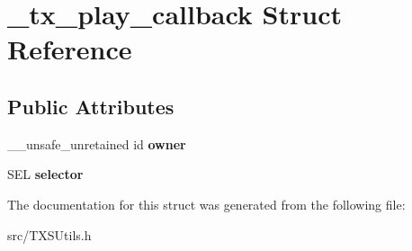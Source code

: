 \hypertarget{struct__tx__play__callback}{}\section{\+\_\+tx\+\_\+play\+\_\+callback Struct Reference}
\label{struct__tx__play__callback}
\subsection*{Public Attributes}
\begin{DoxyCompactItemize}
\item 
\hypertarget{struct__tx__play__callback_a9a0952061e4e4109bb7c64a6f741f4d5}{}\+\_\+\+\_\+unsafe\+\_\+unretained id {\bfseries owner}\label{struct__tx__play__callback_a9a0952061e4e4109bb7c64a6f741f4d5}

\item 
\hypertarget{struct__tx__play__callback_af75304afdce8a1c01a266d6ac67e3ef1}{}S\+E\+L {\bfseries selector}\label{struct__tx__play__callback_af75304afdce8a1c01a266d6ac67e3ef1}

\end{DoxyCompactItemize}


The documentation for this struct was generated from the following file\+:\begin{DoxyCompactItemize}
\item 
src/T\+X\+S\+Utils.\+h\end{DoxyCompactItemize}

